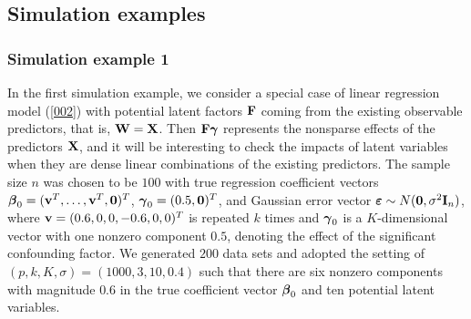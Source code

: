 \documentclass{statsoc}
\newcommand{\bv}{\mbox{\bf v}}
\newcommand{\bF}{\mbox{\bf F}}
\newcommand{\bI}{\mbox{\bf I}}
\newcommand{\bW}{\mbox{\bf W}}
\newcommand{\bX}{\mbox{\bf X}}
\newcommand{\bzero}{\mbox{\bf 0}}
\newcommand{\bveps}{\mbox{\boldmath $\varepsilon$}}
\newcommand{\bbeta}{\mbox{\boldmath $\beta$}}
\newcommand{\bgamma}{\mbox{\boldmath $\gamma$}}
\def\t{^T}
\begin{document}
%

\subsection{Simulation examples} \label{Sec6.1}

\subsubsection{Simulation example 1} \label{Sec6.1.1}

In the first simulation example, we consider a special case of linear regression model (\ref{002}) with potential latent factors $\bF$ coming from the existing observable predictors, that is, $\bW = \bX$. Then $\bF \bgamma$ represents the nonsparse effects of the predictors $\bX$, and it will be interesting to check the impacts of latent variables when they are dense linear combinations of the existing predictors. The sample size $n$ was chosen to be $100$ with true regression coefficient vectors $\bbeta_0 = (\bv\t,\dots,\bv\t,\bzero)\t$, $\bgamma_0 = (0.5,\bzero)\t$, and Gaussian error vector $\bveps \sim N(\textbf{0},\sigma^2 \bI_n)$, where $\bv = (0.6, 0, 0, -0.6, 0, 0)\t$ is repeated $k$ times and $\bgamma_0$ is a $K$-dimensional vector with one nonzero component $0.5$, denoting the effect of the significant confounding factor. We generated $200$ data sets and adopted the setting of $(p, k, K, \sigma) = (1000, 3, 10, 0.4)$ such that there are six nonzero components with magnitude $0.6$ in the true coefficient vector $\bbeta_0$ and ten potential latent variables.
\end{document}
